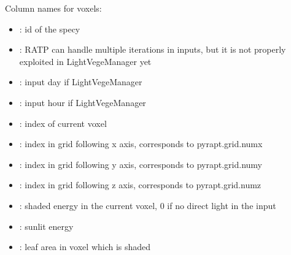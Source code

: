 \documentclass[letterpaper,10pt,english]{sphinxmanual}
\begin{document}
\sphinxAtStartPar
Column names for voxels:
\begin{itemize}
\item {} 
\sphinxAtStartPar
{}: id of the specy

\item {} 
\sphinxAtStartPar
{}: RATP can handle multiple iterations in inputs, but it is not properly exploited in LightVegeManager yet

\item {} 
\sphinxAtStartPar
{}: input day if LightVegeManager

\item {} 
\sphinxAtStartPar
{}: input hour if LightVegeManager

\item {} 
\sphinxAtStartPar
{}: index of current voxel

\item {} 
\sphinxAtStartPar
{}: index in grid following x axis, corresponds to pyrapt.grid.numx

\item {} 
\sphinxAtStartPar
{}: index in grid following y axis, corresponds to pyrapt.grid.numy

\item {} 
\sphinxAtStartPar
{}: index in grid following z axis, corresponds to pyrapt.grid.numz

\item {} 
\sphinxAtStartPar
{}: shaded energy in the current voxel, 0 if no direct light in the input

\item {} 
\sphinxAtStartPar
{}: sunlit energy

\item {} 
\sphinxAtStartPar
{}: leaf area in voxel which is shaded


\end{itemize}
\end{document}
